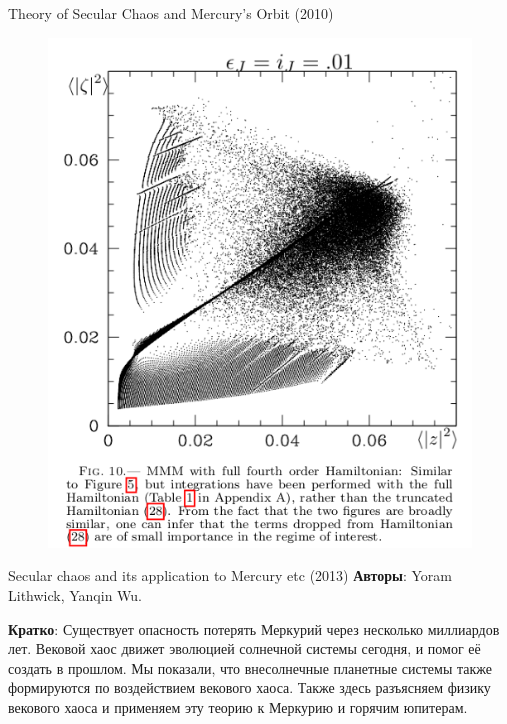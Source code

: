 \documentclass{beamer}
\begin{document}
\begin{frame}{Theory of Secular Chaos and Mercury's Orbit (2010)}
\begin{figure}[h]
\begin{minipage}[h]{0.65\linewidth}
\includegraphics[width=1\linewidth]{./10_6.png}
\end{minipage}
\end{figure}
\end{frame}

\begin{frame}{Secular chaos and its application to Mercury etc (2013)}
        \textbf{Авторы}: Yoram Lithwick, Yanqin Wu.

        \textbf{Кратко}: Существует опасность потерять Меркурий через несколько миллиардов лет. Вековой хаос движет эволюцией солнечной системы сегодня, и помог её создать в прошлом. Мы показали, что внесолнечные планетные системы также формируются по воздействием векового хаоса. Также здесь разъясняем физику векового хаоса и применяем эту теорию к Меркурию и горячим юпитерам.
\end{frame}
\end{document}
